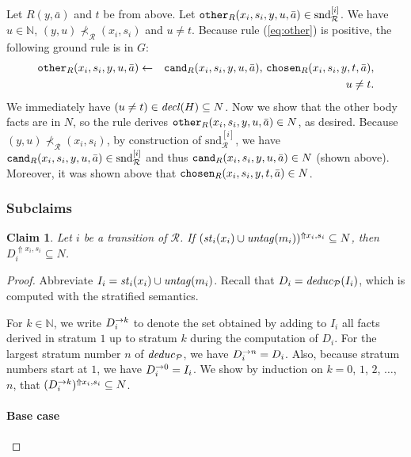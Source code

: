 \documentclass{tlp}
\newtheorem{claim}[theorem]{Claim}
\newcommand{\Nat}{\mathbb{N}}  \newcommand{\len}[1]{|#1|} \newcommand{\rom}[1]{\text{\emph{(#1)}}} \newcommand{\romI}{\rom i}
\newcommand{\ded}{\mathcal{P}}
\newcommand{\sh}[1]{(#1)}
\newcommand{\addlt}[3]{#1^{\Uparrow#2,#3}}
\newcommand{\shaddlt}[3]{\addlt{\sh{#1}}{#2}{#3}}
\newcommand{\chosen}{\pred{chosen}}
\newcommand{\other}{\pred{other}}
\newcommand{\cand}{\pred{cand}}
\newcommand{\decl}[1]{\fname{decl}(#1)}
\newcommand{\cnfs}{\mathit{st}}
\newcommand{\run}{\mathcal{R}}
\newcommand{\untag}[1]{\fname{untag}(#1)}
\newcommand{\deduc}[1]{\fname{deduc}_{#1}}
\newcommand{\slicesnd}[1]{\text{snd}_{\run}^{[#1]}}
\newcommand{\caus}{\prec_{\run}}
\newcommand{\grded}{G}
\begin{document}
\begin{appendix}
Let $R(y,\bar{a})$ and $t$ be from above. Let $\other_{R}(x_{i},s_{i},y,u,\bar{a})\in\slicesnd i$.
We have $u\in\Nat$, $(y,u)\not\caus(x_{i},s_{i})$ and $u\neq t$.
Because rule (\ref{eq:other}) is positive, the following ground rule
is in $\grded$:
\begin{eqnarray*}
\other_{R}(x_{i},s_{i},y,u,\bar{a}) & \gets & \cand_{R}(x_{i},s_{i},y,u,\bar{a}),\,\chosen_{R}(x_{i},s_{i},y,t,\bar{a}),\\
 &  & u\neq t.
\end{eqnarray*}
We immediately have $(u\neq t)\in\decl H\subseteq N$. Now we show
that the other body facts are in $N$, so the rule derives $\other_{R}(x_{i},s_{i},y,u,\bar{a})\in N$,
as desired. Because $(y,u)\not\caus(x_{i},s_{i})$, by construction
of $\slicesnd i$, we have $\cand_{R}(x_{i},s_{i},y,u,\bar{a})\in\slicesnd i$
and thus $\cand_{R}(x_{i},s_{i},y,u,\bar{a})\in N$ (shown above).
Moreover, it was shown above that $\chosen_{R}(x_{i},s_{i},y,t,\bar{a})\in N$.


\subsubsection{Subclaims}

\label{sub:run-to-model-first-dir--claims}



\begin{claim}\label{claim:duc-in-stable}Let $i$ be a transition
of $\run$. If $\addlt{(\cnfs_{i}(x_{i})\cup\untag{m_{i}})}{x_{i}}{s_{i}}\subseteq N$,
then $\addlt{D_{i}}{x_{i}}{s_{i}}\subseteq N$.\end{claim}

\begin{proof}

Abbreviate $I_{i}=\cnfs_{i}(x_{i})\cup\untag{m_{i}}$. Recall that
$D_{i}=\deduc{\ded}(I_{i})$, which is computed with the stratified
semantics.

For $k\in\Nat$, we write $D_{i}^{\to k}$ to denote the set obtained
by adding to $I_{i}$ all facts derived in stratum $1$ up to stratum
$k$ during the computation of $D_{i}$. For the largest stratum number
$n$ of $\deduc{\ded}$, we have $D_{i}^{\to n}=D_{i}$. Also, because
stratum numbers start at $1$, we have $D_{i}^{\to0}=I_{i}$. We
show by induction on $k=0$, $1$, $2$, $\ldots$, $n$, that $\shaddlt{\strat{D_{i}}k}{x_{i}}{s_{i}}\subseteq N$.
 


\paragraph*{Base case}


\end{proof}
\end{appendix}
\end{document}
